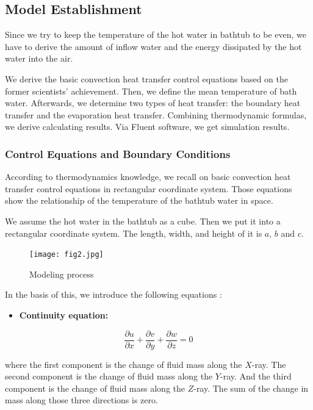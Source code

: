 \documentclass{mcmthesis}
\begin{document}
\subsection{Model Establishment}

Since we try to keep the temperature of the hot water in bathtub to be even, we have to derive the amount of inflow water and the energy dissipated by the hot water into the air.

We derive the basic convection heat transfer control equations based on the former scientists’ achievement. Then, we define the mean temperature of bath water. Afterwards, we determine two types of heat transfer: the boundary heat transfer and the evaporation heat transfer. Combining thermodynamic formulas, we derive calculating results. Via Fluent software, we get simulation results.

\subsubsection{Control Equations and Boundary Conditions}

According to thermodynamics knowledge, we recall on basic convection
heat transfer control equations in rectangular coordinate system. Those
equations show the relationship of the temperature of the bathtub water in space.

We assume the hot water in the bathtub as a cube. Then we put it into a
rectangular coordinate system. The length, width, and height of it is $a,\, b$ and $c$.

\begin{figure}[h] 
\centering
\texttt{[image: fig2.jpg]}
\caption{Modeling process} \label{fig2}
\end{figure}

In the basis of this, we introduce the following equations \cite{5}:

\begin{itemize}
\item {\bf Continuity equation:}
\end{itemize}

\begin{equation} \label{eq1}
\frac{\partial u}{\partial x} + \frac{\partial v}{\partial y} +\frac{\partial w}{\partial z} =0
\end{equation}

\noindent where the first component is the change of fluid mass along the $X$-ray. The second component is the change of fluid mass along the $Y$-ray. And the third component is the change of fluid mass along the $Z$-ray. The sum of the change in mass along those three directions is zero.
\end{document}
